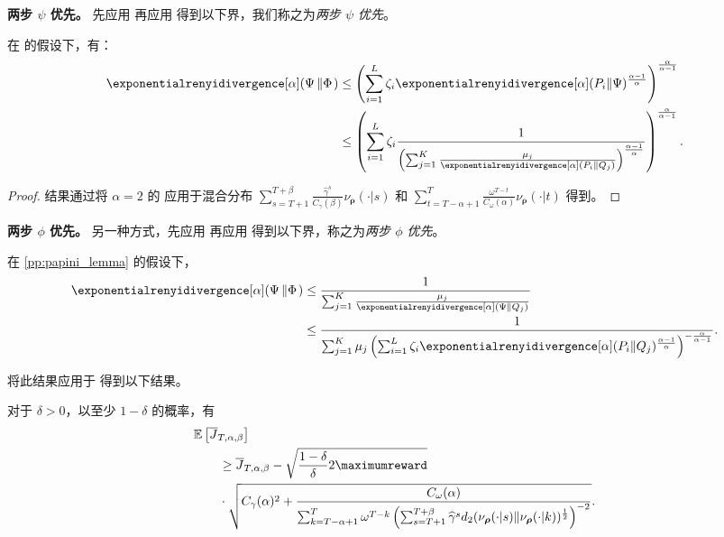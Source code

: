 \textbf{两步 $\psi$ 优先。}
\label{subsubsec:two_steps_psi_first}
先应用  再应用  得到以下界，我们称之为\textit{两步 $\psi$ 优先}。

\begin{prop}
\label{pp:var_bound_2_steps_psi_first}
    在  的假设下，有：
    \begin{align*}
        \exponentialrenyidivergence[\alpha](\Psi\left\Vert \Phi\right.)
        &\leq
        \left(\sum_{i=1}^L \zeta_i \exponentialrenyidivergence[\alpha](P_i\Vert \Psi)^{\frac{\alpha-1}{\alpha}}\right)^{\frac{\alpha}{\alpha-1}}\\
        &\leq
        \left(\sum_{i=1}^L \zeta_i \frac{1}{\left(\sum_{j=1}^K\frac{\mu_j}{\exponentialrenyidivergence[\alpha]( P_i \Vert Q_j)}\right)^{\frac{\alpha-1}{\alpha}}}\right)^{\frac{\alpha}{\alpha-1}}.
    \end{align*}
\end{prop}


\renyidivergencebound*
\begin{proof}
    结果通过将 $\alpha=2$ 的  应用于混合分布 $\textstyle\sum_{s=T+1}^{T+\beta} \frac{\widehat{\gamma}^s}{C_\gamma(\beta)} \nu_{\boldsymbol\rho}(\cdot|s)$ 和 $\textstyle\sum_{t=T-\alpha+1}^{T} \frac{\omega^{T-t} }{C_\omega(\alpha)}\nu_{\boldsymbol\rho}(\cdot|t)$ 得到。
\end{proof}



\textbf{两步 $\phi$ 优先。}
另一种方式，先应用  再应用  得到以下界，称之为\textit{两步 $\phi$ 优先}。

\begin{prop}
    在 \cref{pp:papini_lemma} 的假设下，
    \begin{align*}
    \exponentialrenyidivergence[\alpha](\Psi\left\Vert \Phi\right.)
    &\leq \frac{1}{\sum_{j=1}^K \frac{\mu_j}{\exponentialrenyidivergence[\alpha](\Psi\Vert Q_j)}}
    \\
    &\leq \frac{1}{\sum_{j=1}^K \mu_j \left(\sum_{i=1}^L \zeta_i \exponentialrenyidivergence[\alpha](P_i\Vert Q_j)^{\frac{\alpha-1}{\alpha}}\right)^{-\frac{\alpha}{\alpha-1}} }.
\end{align*}
\end{prop}

将此结果应用于  得到以下结果。

\begin{prop}
    对于 $\delta>0$，以至少 $1-\delta$ 的概率，有
\begin{align*}
    &\mathbb{E}\left[\overline{J}_{T,\alpha,\beta} \right]
    \\
    &\qquad\geq
    \overline{J}_{T,\alpha,\beta} - \sqrt{
            \frac{1-\delta}{\delta} 2\maximumreward}
    \\
    &\qquad\cdot\sqrt{C_\gamma(\alpha)^2 +
            \frac{ C_\omega(\alpha)}{\sum_{ k=T-\alpha+1}^{ T}\omega^{T-k} \left(\sum_{ s=T+1}^{ T+\beta} \widehat{\gamma}^s d_2(\nu_{\boldsymbol\rho}(\cdot\vert s)\Vert \nu_{\boldsymbol\rho}(\cdot\vert k))^{\frac{1}{2}}\right)^{-2} }}.
\end{align*}
\end{prop}


